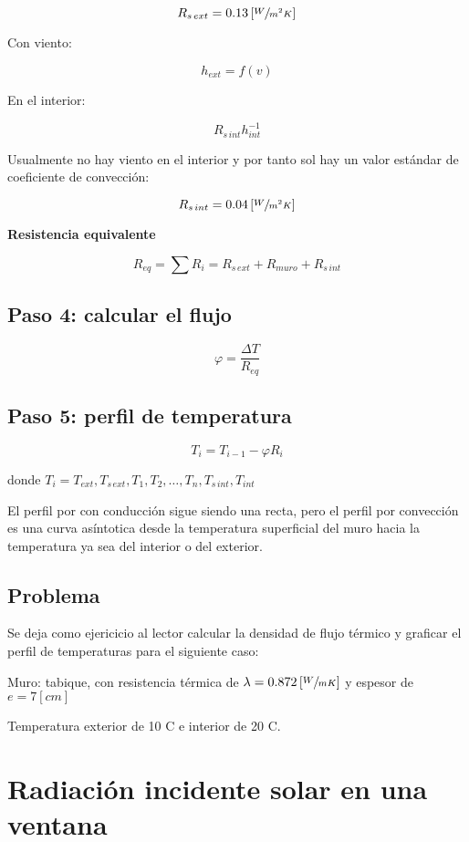 \documentclass[11pt]{article}
\begin{document}
\[ R_{ s \, ext } = 0.13 \left[ \sfrac{ W }{ m ^ 2 K } \right] \]

Con viento:

\[ h_{ ext } = f \left( v \right) \]

En el interior:

\[ R_{ s \, int } h_{ int } ^{ -1 } \]

Usualmente no hay viento en el interior y por tanto sol hay un valor estándar de coeficiente de convección:

\[ R_{ s\, int } = 0.04 \left[ \sfrac{ W }{ m ^ 2 K } \right] \]

\textbf{Resistencia equivalente}

\[ R_{ eq } = \sum{ R_i } = R_{ s \, ext } + R_{ muro } + R_{ s \, int } \]

\subsection{Paso 4: calcular el flujo}

\[ \varphi = \frac{ \Delta T }{ R_{ eq } } \]

\subsection{Paso 5: perfil de temperatura}

\[ T_i = T_{ i - 1 } - \varphi R_i \]

donde $ T_i = T_{ ext }, T_{ s \, ext }, T_1, T_2, \ldots , T_n, T_{s \, int }, T_{ int } $

El perfil por con conducción sigue siendo una recta, pero el perfil por convección es una curva asíntotica desde la temperatura superficial del muro hacia la temperatura ya sea del interior o del exterior.

\subsection*{ Problema }

Se deja como ejericicio al lector calcular la densidad de flujo térmico y graficar el perfil de temperaturas para el siguiente caso:

Muro: tabique, con resistencia térmica de $ \lambda = 0.872 \left[ \sfrac{ W }{ m K } \right] $ y espesor de $ e = 7 \left[ cm \right]$

Temperatura exterior de 10 \degree C e interior de 20 \degree C.

\section{Radiación incidente solar en una ventana}
\end{document}
